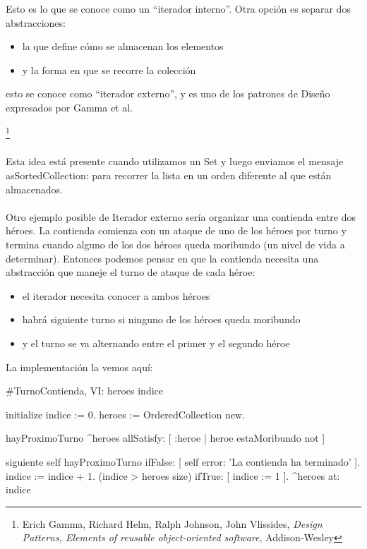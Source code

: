 \documentclass[a4paper,12pt]{book}
\begin{document}
Esto es lo que se conoce como un ``iterador interno''. Otra opción es separar dos abstracciones:

\begin{itemize}
 \item la que define cómo se almacenan los elementos
 \item y la forma en que se recorre la colección
\end{itemize}

esto se conoce como ``iterador externo'', y es uno de los patrones de Diseño expresados por Gamma et al.{\footnote{
Erich Gamma, Richard Helm, Ralph Johnson, John Vlissides, \textit{Design Patterns, Elements of reusable 
object-oriented software}, Addison-Wesley}
\\
\\
Esta idea está presente cuando utilizamos un Set y luego enviamos el mensaje asSortedCollection: para recorrer
la lista en un orden diferente al que están almacenados. 
\\
\\
Otro ejemplo posible de Iterador externo sería organizar una contienda entre dos héroes. La contienda comienza
con un ataque de uno de los héroes por turno y termina cuando alguno de los dos héroes queda moribundo
(un nivel de vida a determinar). Entonces podemos pensar en que la contienda necesita una abstracción que
maneje el turno de ataque de cada héroe:

\begin{itemize}
 \item el iterador necesita conocer a ambos héroes
 \item habrá siguiente turno si ninguno de los héroes queda moribundo
 \item y el turno se va alternando entre el primer y el segundo héroe
\end{itemize}

La implementación la vemos aquí:

\begin{code}
#TurnoContienda, VI: heroes indice

initialize
   indice := 0.
   heroes := OrderedCollection new.
   
hayProximoTurno
   ^heroes allSatisfy: [ :heroe | heroe estaMoribundo not ]
   
siguiente
   self hayProximoTurno 
        ifFalse: [ self error: 'La contienda ha terminado' ].
   indice := indice + 1.
   (indice > heroes size) ifTrue: [ indice := 1 ].
   ^heroes at: indice
\end{code}

}
\end{document}
